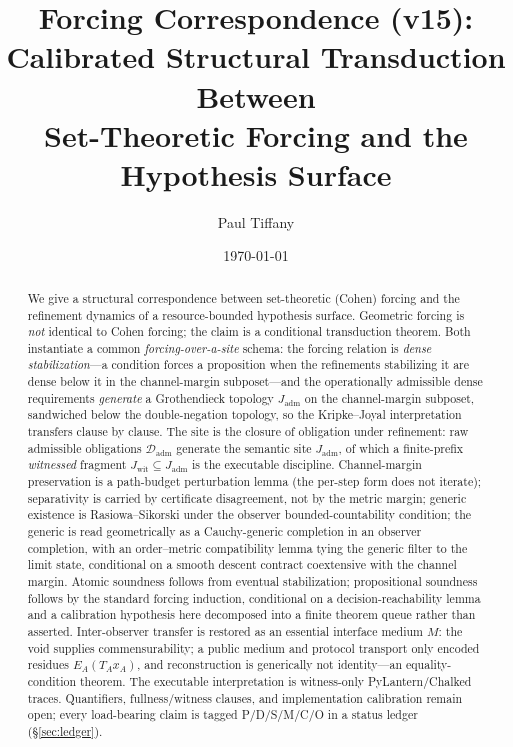 \documentclass[11pt]{article}
\title{Forcing Correspondence (v15):\\ Calibrated Structural Transduction Between\\
Set-Theoretic Forcing and the Hypothesis Surface}
\author{Paul Tiffany}
\date{\today}
\theoremstyle{definition}
\theoremstyle{remark}
\newcommand{\Dadm}{\mathcal{D}_{\mathrm{adm}}}
\newcommand{\Jadm}{J_{\mathrm{adm}}}
\newcommand{\Jwit}{J_{\mathrm{wit}}}
\begin{document}
\maketitle

\begin{abstract}
We give a structural correspondence between set-theoretic (Cohen) forcing and the refinement
 dynamics of a resource-bounded hypothesis surface. Geometric forcing is \emph{not} identical to
 Cohen forcing; the claim is a conditional transduction theorem. Both instantiate a common
 \emph{forcing-over-a-site} schema: the forcing relation is \emph{dense stabilization}---a condition
 forces a proposition when the refinements stabilizing it are dense below it in the channel-margin
 subposet---and the operationally admissible dense requirements \emph{generate} a Grothendieck
 topology $\Jadm$ on the channel-margin subposet, sandwiched below the double-negation topology, so
 the Kripke--Joyal interpretation transfers clause by clause. The site is the closure of obligation
 under refinement: raw admissible obligations $\Dadm$ generate the semantic site $\Jadm$, of which a
 finite-prefix \emph{witnessed} fragment $\Jwit\subseteq\Jadm$ is the executable discipline.
 Channel-margin preservation is a path-budget perturbation lemma (the per-step form does not
 iterate); separativity is carried by certificate disagreement, not by the metric margin; generic existence is Rasiowa--Sikorski under the observer
 bounded-countability condition; the generic is read geometrically as a Cauchy-generic completion in
 an observer completion, with an order--metric compatibility lemma tying the generic filter to the
 limit state, conditional on a smooth descent contract coextensive with the channel margin. Atomic
 soundness follows from eventual stabilization; propositional soundness follows by the standard
 forcing induction, conditional on a decision-reachability lemma and a calibration hypothesis here
 decomposed into a finite theorem queue rather than asserted. Inter-observer transfer is restored as
 an essential interface medium $M$: the void supplies commensurability; a public medium and protocol
 transport only encoded residues $E_A(T_Ax_A)$, and reconstruction is generically not identity---an
 equality-condition theorem. The executable interpretation is witness-only PyLantern/Chalked traces.
 Quantifiers, fullness/witness clauses, and implementation calibration remain open; every load-bearing
 claim is tagged P/D/S/M/C/O in a status ledger (\S\ref{sec:ledger}).
\end{abstract}
\end{document}
